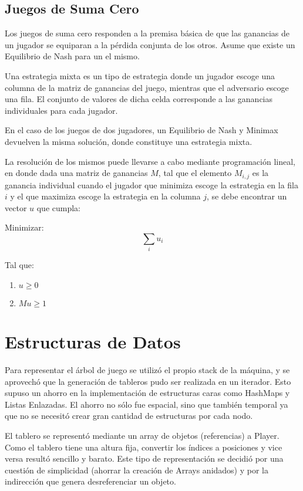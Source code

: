 \documentclass[10pt,a4paper,notitlepage]{article}
\newenvironment{definition}[1][Definición]{\begin{trivlist}
\item[\hskip \labelsep {\bfseries #1}]}{\end{trivlist}}
\begin{document}
\subsection{Juegos de Suma Cero}

Los juegos de suma cero responden a la premisa básica de que las ganancias de un jugador se equiparan a la pérdida conjunta de los otros. Asume que existe un Equilibrio de Nash para un el mismo.

\begin{definition}
Una estrategia mixta es un tipo de estrategia donde un jugador escoge una columna de la matriz de ganancias del juego, mientras que el adversario escoge una fila. El conjunto de valores de dicha celda corresponde a las ganancias individuales para cada jugador.
\end{definition}

En el caso de los juegos de dos jugadores, un Equilibrio de Nash y Minimax devuelven la misma solución, donde constituye una estrategia mixta.

La resolución de los mismos puede llevarse a cabo mediante programación lineal, en donde dada una matriz de ganancias $M$, tal que el elemento $M_{i, j}$ es la ganancia individual cuando el jugador que minimiza escoge la estrategia en la fila $i$ y el que maximiza escoge la estrategia en la columna $j$, se debe encontrar un vector $u$ que cumpla:

Minimizar:
\begin{equation}
\sum_{i} u_i
\end{equation}

Tal que:
\begin{enumerate}
\item $u \geq 0$
\item $M u \geq 1$
\end{enumerate}
\cite{mic}

\section{Estructuras de Datos}
Para representar el árbol de juego se utilizó el propio stack de la máquina, y se aprovechó que la generación de tableros pudo ser realizada en un iterador. Esto supuso un ahorro en la implementación de estructuras caras como HashMaps y Listas Enlazadas. El ahorro no sólo fue espacial, sino que también temporal ya que no se necesitó crear gran cantidad de estructuras por cada nodo.

El tablero se representó mediante un array de objetos (referencias) a Player. Como el tablero tiene una altura fija, convertir los índices a posiciones y vice versa resultó sencillo y barato. Este tipo de representación se decidió por una cuestión de simplicidad (ahorrar la creación de Arrays anidados) y por la indirección que genera desreferenciar un objeto.
\end{document}
